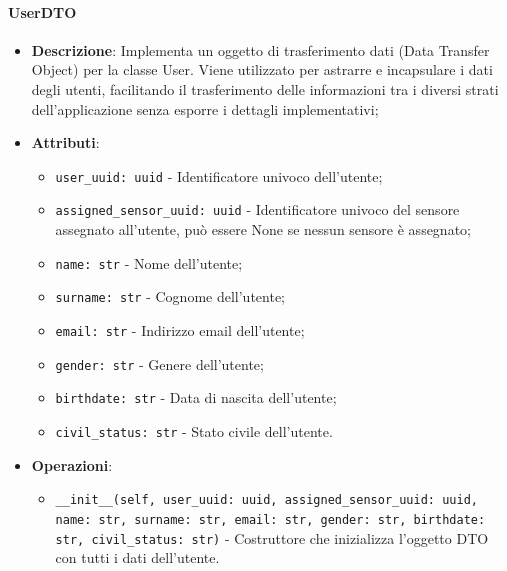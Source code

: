 \documentclass[10pt]{article}
\begin{document}
    \paragraph{UserDTO}
    \begin{itemize} 
    \item \textbf{Descrizione}: Implementa un oggetto di trasferimento dati (Data Transfer Object) per la classe User. Viene utilizzato per astrarre e incapsulare i dati degli utenti, facilitando il trasferimento delle informazioni tra i diversi strati dell'applicazione senza esporre i dettagli implementativi;
    \item \textbf{Attributi}:
    \begin{itemize}
        \item \texttt{user\_uuid: uuid} - Identificatore univoco dell'utente;
        \item \texttt{assigned\_sensor\_uuid: uuid} - Identificatore univoco del sensore assegnato all'utente, può essere None se nessun sensore è assegnato;
        \item \texttt{name: str} - Nome dell'utente;
        \item \texttt{surname: str} - Cognome dell'utente;
        \item \texttt{email: str} - Indirizzo email dell'utente;
        \item \texttt{gender: str} - Genere dell'utente;
        \item \texttt{birthdate: str} - Data di nascita dell'utente;
        \item \texttt{civil\_status: str} - Stato civile dell'utente.
    \end{itemize}
    
    \item \textbf{Operazioni}:
    \begin{itemize}
        \item \texttt{\_\_init\_\_(self, user\_uuid: uuid, assigned\_sensor\_uuid: uuid, name: str, surname: str, email: str, gender: str, birthdate: str, civil\_status: str)} - Costruttore che inizializza l'oggetto DTO con tutti i dati dell'utente.
    \end{itemize}
    \end{itemize}
\end{document}
